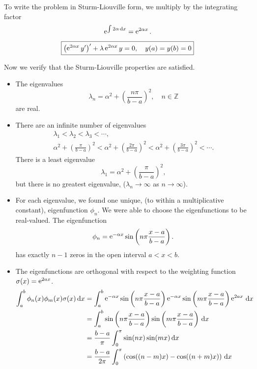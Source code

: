 {\begin{Solution}
  To write the problem in Sturm-Liouville form, we multiply by the integrating
  factor
  \[
  \mathop{\mathrm{e}}\nolimits^{\int 2 \alpha \,\mathrm{d} x} = \mathop{\mathrm{e}}\nolimits^{2 \alpha x}.
  \]
  \[
  \boxed{
    \left( \mathop{\mathrm{e}}\nolimits^{2 \alpha x} y' \right)' + \lambda \mathop{\mathrm{e}}\nolimits^{2 \alpha x} y  = 0, 
    \quad y(a) = y(b) = 0
    }
  \]

  Now we verify that the Sturm-Liouville properties are satisfied.
  \begin{itemize}
  \item   
    The eigenvalues 
    \[
    \lambda_n = \alpha^2 + \left( \frac{n \pi}{b - a} \right)^2, 
    \quad n \in \mathbb{Z}
    \]
    are real.
  \item   
    There are an infinite number of eigenvalues
    \begin{gather*} 
      \lambda_1 < \lambda_2 < \lambda_3 < \cdots, \\
      \alpha^2 + \left( \frac{\pi}{b - a} \right)^2 <
      \alpha^2 + \left( \frac{2 \pi}{b - a} \right)^2 <
      \alpha^2 + \left( \frac{3 \pi}{b - a} \right)^2 < \cdots.
    \end{gather*}
    There is a least eigenvalue 
    \[
    \lambda_1 = \alpha^2 + \left( \frac{\pi}{b - a} \right)^2, 
    \]
    but there is no greatest eigenvalue,
    ($\lambda_n \to \infty$ as $n \to \infty$).
  \item   
    For each eigenvalue, we found one unique, (to within a multiplicative
    constant), eigenfunction $\phi_n$.  We were able to choose the eigenfunctions 
    to be real-valued.   The eigenfunction 
    \[
    \phi_n = \mathop{\mathrm{e}}\nolimits^{-\alpha x} \sin \left( n \pi \frac{x - a}{b - a} \right).
    \]
    has exactly $n-1$ zeros in the open interval $a < x < b$. 
  \item   The eigenfunctions are orthogonal with respect to the weighting
    function $\sigma(x) = \mathop{\mathrm{e}}\nolimits^{2 a x}$.
    \begin{align*} 
      \int_a^b \phi_n(x) \phi_m(x) \sigma(x)\,\dd x 
      &= \int_a^b 
      \e^{-\alpha x} \sin \left( n \pi \frac{x - a}{b - a} \right)
      \e^{-\alpha x} \sin \left( m \pi \frac{x - a}{b - a} \right)
      \e^{2 a x} \,\dd x \\
      &= \int_a^b 
      \sin \left( n \pi \frac{x - a}{b - a} \right)
      \sin \left( m \pi \frac{x - a}{b - a} \right)
      \,\dd x \\
      &= \frac{b-a}{\pi} \int_0^\pi \sin(n x) \sin(m x) \,\dd x \\
      &= \frac{b-a}{2\pi} \int_0^\pi 
      \left( \cos((n-m) x) - \cos((n+m) x) \right) \,\dd x \\

\end{align*}
\end{itemize}
\end{Solution}}
